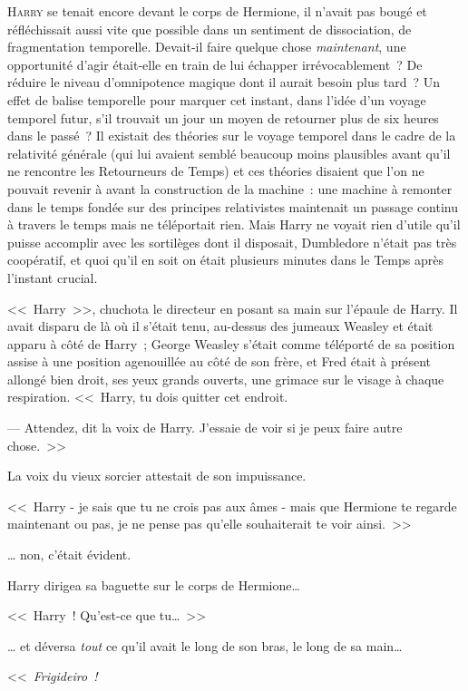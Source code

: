 
\lettrine{H}{arry} se tenait encore devant le corps de Hermione, il n'avait pas bougé et réfléchissait aussi vite que possible dans un sentiment de dissociation, de fragmentation temporelle. Devait-il faire quelque chose \emph{maintenant}, une opportunité d'agir était-elle en train de lui échapper irrévocablement~? De réduire le niveau d'omnipotence magique dont il aurait besoin plus tard~? Un effet de balise temporelle pour marquer cet instant, dans l'idée d'un voyage temporel futur, s'il trouvait un jour un moyen de retourner plus de six heures dans le passé~? Il existait des théories sur le voyage temporel dans le cadre de la relativité générale (qui lui avaient semblé beaucoup moins plausibles avant qu'il ne rencontre les Retourneurs de Temps) et ces théories disaient que l'on ne pouvait revenir à avant la construction de la machine~: une machine à remonter dans le temps fondée sur des principes relativistes maintenait un passage continu à travers le temps mais ne téléportait rien. Mais Harry ne voyait rien d'utile qu'il puisse accomplir avec les sortilèges dont il disposait, Dumbledore n'était pas très coopératif, et quoi qu'il en soit on était plusieurs minutes dans le Temps après l'instant crucial.

<<~Harry~>>, chuchota le directeur en posant sa main sur l'épaule de Harry. Il avait disparu de là où il s'était tenu, au-dessus des jumeaux Weasley et était apparu à côté de Harry~; George Weasley s'était comme téléporté de sa position assise à une position agenouillée au côté de son frère, et Fred était à présent allongé bien droit, ses yeux grands ouverts, une grimace sur le visage à chaque respiration. <<~Harry, tu dois quitter cet endroit.

--- Attendez, dit la voix de Harry. J'essaie de voir si je peux faire autre chose.~>>

La voix du vieux sorcier attestait de son impuissance.

<<~Harry - je sais que tu ne crois pas aux âmes - mais que Hermione te regarde maintenant ou pas, je ne pense pas qu'elle souhaiterait te voir ainsi.~>>

… non, c'était évident.

Harry dirigea sa baguette sur le corps de Hermione…

<<~Harry~! Qu'est-ce que tu…~>>

… et déversa \emph{tout} ce qu'il avait le long de son bras, le long de sa main…

<<~\emph{Frigideiro~!}

